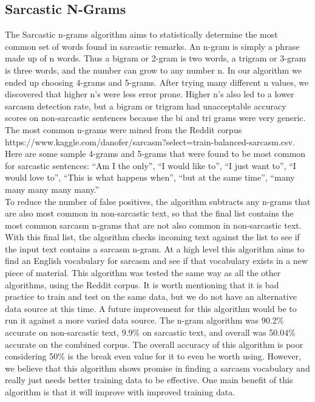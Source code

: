 \documentclass[conference]{IEEEtran}
\begin{document}
\subsection{Sarcastic N-Grams}
The Sarcastic n-grams algorithm aims to statistically determine the most common set of words found in sarcastic remarks. An n-gram is simply a phrase made up of n words. Thus a bigram or 2-gram is two words, a trigram or 3-gram is three words, and the number can grow to any number n. In our algorithm we ended up choosing 4-grams and 5-grams. After trying many different n values, we discovered that higher n’s were less error prone. Higher n’s also led to a lower sarcasm detection rate, but a bigram or trigram had unacceptable accuracy scores on non-sarcastic sentences because the bi and tri grams were very generic. The most common n-grams were mined from the Reddit corpus https://www.kaggle.com/danofer/sarcasm?select=train-balanced-sarcasm.csv. Here are some sample 4-grams and 5-grams that were found to be most common for sarcastic sentences: “Am I the only”, “I would like to”, “I just want to”, “I would love to”, “This is what happens when”, “but at the same time”, “many many many many many.” \\
To reduce the number of false positives, the algorithm subtracts any n-grams that are also most common in non-sarcastic text, so that the final list contains the most common sarcasm n-grams that are not also common in non-sarcastic text. With this final list, the algorithm checks incoming text against the list to see if the input text contains a sarcasm n-gram. At a high level this algorithm aims to find an English vocabulary for sarcasm and see if that vocabulary exists in a new piece of material. This algorithm was tested the same way as all the other algorithms, using the Reddit corpus. It is worth mentioning that it is bad practice to train and test on the same data, but we do not have an alternative data source at this time. A future improvement for this algorithm would be to run it against a more varied data source. The n-gram algorithm was 90.2\% accurate on non-sarcastic text, 9.9\% on sarcastic text, and overall was 50.04\% accurate on the combined corpus. The overall accuracy of this algorithm is poor considering 50\% is the break even value for it to even be worth using. However, we believe that this algorithm shows promise in finding a sarcasm vocabulary and really just needs better training data to be effective. One main benefit of this algorithm is that it will improve with improved training data.\\
\end{document}
